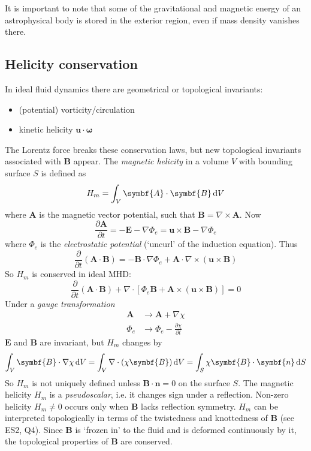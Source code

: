 \documentclass{jknotes}
\newcommand{\B}{\symbf{B}}
\renewcommand{\u}{\symbf{u}}
\begin{document}
It is important to note that some of the gravitational and magnetic energy of
an astrophysical body is stored in the exterior region, even if mass density
vanishes there.

\subsection{Helicity conservation}
In ideal fluid dynamics there are geometrical or topological invariants:
\begin{itemize}
	\item (potential) vorticity/circulation
	\item kinetic helicity $\u \cdot \symbf{\omega}$
\end{itemize}

The Lorentz force breaks these conservation laws, but new topological
invariants associated with $\B$ appear. The \emph{magnetic helicity} in a
volume $V$ with bounding surface $S$ is defined as
\begin{equation}
	H_m = \int_V \symbf{A} \cdot \B \, \diffd V
\end{equation}
where $\symbf{A}$ is the magnetic vector potential, such that $\B = \nabla
\times \symbf{A}$. Now
\begin{equation}
	\frac{\partial \symbf{A}}{\partial t} = - \symbf{E} - \nabla \Phi_e = \u
	\times \B - \nabla \Phi_e
\end{equation}
where $\Phi_e$ is the \emph{electrostatic potential} (`uncurl' of the
induction equation). Thus
\begin{equation}
	\frac{\partial}{\partial t}(\symbf{A} \cdot \B) = - \B \cdot \nabla \Phi_e
	+ \symbf{A} \cdot \nabla \times (\u \times \B)
\end{equation}
So $H_m$ is conserved in ideal MHD:
\begin{equation}
	\frac{\partial}{\partial t}(\symbf{A} \cdot \B) + \nabla \cdot \left[
	\Phi_e \B + \symbf{A} \times (\u \times \B) \right] = 0
\end{equation}
Under a \emph{gauge transformation}
\begin{align}
	\symbf{A} &\to \symbf{A} + \nabla \chi \\
	\Phi_e &\to \Phi_e - \frac{\partial \chi}{\partial t}
\end{align}
$\symbf{E}$ and $\B$ are invariant, but $H_m$ changes by
\begin{equation}
	\int_V \B \cdot \nabla \chi \, \diffd V = \int_V \nabla \cdot (\chi \B)
	\, \diffd V = \int_S \chi \B \cdot \symbf{n} \, \diffd S
\end{equation}
So $H_m$ is not uniquely defined unless $\B\cdot\symbf{n} = 0$ on the surface
$S$. The magnetic helicity $H_m$ is a \emph{pseudoscalar}, i.e. it changes
sign under a reflection.  Non-zero helicity $H_m \ne 0$ occurs only when $\B$
lacks reflection symmetry.  $H_m$ can be interpreted topologically in terms of
the twistedness and knottedness of $\B$ (see ES2, Q4). Since $\B$ is `frozen
in' to the fluid and is deformed continuously by it, the topological
properties of $\B$ are conserved.
\end{document}
